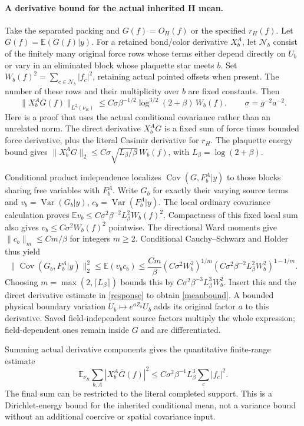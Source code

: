 \documentclass[11pt]{article}
\newcommand{\E}{\mathbb E}
\newcommand{\Cov}{\operatorname{Cov}}
\newcommand{\Var}{\operatorname{Var}}
\begin{document}
\paragraph{A derivative bound for the actual inherited H mean.}
Take the separated packing and $G(f)=O_H(f)$ or the specified $r_H(f)$.
Let $\overline G(f)=\E(G(f)|y)$. For a retained bond/color derivative $X_b^A$, let
$\mathcal N_b$ consist of the finitely many original force rows whose terms either depend
directly on $U_b$ or vary in an eliminated block whose plaquette star meets $b$.
Set $W_b(f)^2=\sum_{c\in\mathcal N_b}|f_c|^2$, retaining actual pointed offsets when
present. The number of these rows and their multiplicity over $b$ are fixed constants.
Then
\begin{equation}\label{meanbound}
 \|X_b^A\overline G(f)\|_{L^2(\nu_R)}
 \le C\sigma\beta^{-1/2}\log^{3/2}(2+\beta)\,W_b(f),
 \qquad \sigma=g^{-2}a^{-2}.
\end{equation}
Here is a proof that uses the actual conditional covariance rather than an unrelated norm.
The direct derivative $X_b^AG$ is a fixed sum of force times bounded force derivative,
plus the literal Casimir derivative for $r_H$. The plaquette energy bound gives
$\|X_b^AG\|_2\le C\sigma\sqrt{L_\beta/\beta}\,W_b(f)$, with
$L_\beta=\log(2+\beta)$.

Conditional product independence localizes $\Cov(G,F_b^A|y)$ to those blocks sharing
free variables with $F_b^A$. Write $G_b$ for exactly their varying source terms and
$v_b=\Var(G_b|y)$, $c_b=\Var(F_b^A|y)$.
The local ordinary covariance calculation proves $\E v_b\le C\sigma^2\beta^{-2}L_\beta^2W_b(f)^2$.
Compactness of this fixed local sum also gives $v_b\le C\sigma^2W_b(f)^2$ pointwise.
The directional Ward moments give $\|c_b\|_m\le Cm/\beta$ for integers $m\ge2$.
Conditional Cauchy--Schwarz and Holder thus yield
\[
 \|\Cov(G_b,F_b^A|y)\|_2^2
 \le\E(v_bc_b)
 \le\frac{Cm}{\beta}
       (C\sigma^2W_b^2)^{1/m}
       (C\sigma^2\beta^{-2}L_\beta^2W_b^2)^{1-1/m}.
\]
Choosing $m=\max(2,\lceil L_\beta\rceil)$ bounds this by
$C\sigma^2\beta^{-3}L_\beta^3W_b^2$.
Insert this and the direct derivative estimate in \eqref{response} to obtain
\eqref{meanbound}. A bounded physical boundary variation $U_b\mapsto e^{aZ_b}U_b$
adds its original factor $a$ to this derivative. Saved field-independent source factors
multiply the whole expression; field-dependent ones remain inside $G$ and are differentiated.

Summing actual derivative components gives the quantitative finite-range estimate
\[
 \E_{\nu_R}\sum_{b,A}|X_b^A\overline G(f)|^2
 \le C\sigma^2\beta^{-1}L_\beta^3\sum_c|f_c|^2.
\]
The final sum can be restricted to the literal completed support. This is a Dirichlet-energy
bound for the inherited conditional mean, not a variance bound without an additional
coercive or spatial covariance input.
\end{document}
